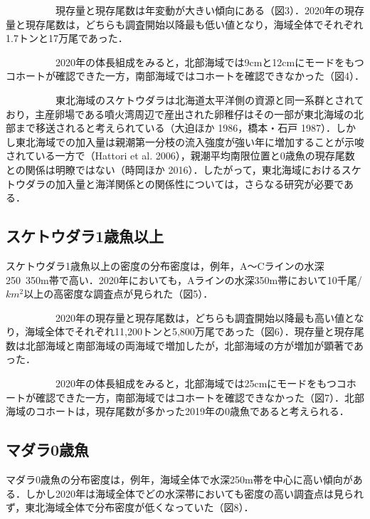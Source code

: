 \documentclass[11pt]{article} %
\begin{document}
\begin{linenumbers}
\ \ \ \ \ \ \ \ \ \ 
現存量と現存尾数は年変動が大きい傾向にある（図3）．2020年の現存量と現存尾数は，どちらも調査開始以降最も低い値となり，海域全体でそれぞれ1.7トンと17万尾であった．

\ \ \ \ \ \ \ \ \ \ 
2020年の体長組成をみると，北部海域では9cmと12cmにモードをもつコホートが確認できた一方，南部海域ではコホートを確認できなかった（図4）．

\ \ \ \ \ \ \ \ \ \ 
東北海域のスケトウダラは北海道太平洋側の資源と同一系群とされており，主産卵場である噴火湾周辺で産出された卵稚仔はその一部が東北海域の北部まで移送されると考えられている（大迫ほか 1986，橋本・石戸 1987）．しかし東北海域での加入量は親潮第一分枝の流入強度が強い年に増加することが示唆されている一方で（Hattori et al. 2006），親潮平均南限位置と0歳魚の現存尾数との関係は明瞭ではない（時岡ほか 2016）．したがって，東北海域におけるスケトウダラの加入量と海洋関係との関係性については，さらなる研究が必要である．

\subsection{スケトウダラ1歳魚以上}
スケトウダラ1歳魚以上の密度の分布密度は，例年，A〜Cラインの水深250~350m帯で高い．2020年においても，Aラインの水深350m帯において10千尾/$km^2$以上の高密度な調査点が見られた（図5）．

\ \ \ \ \ \ \ \ \ \ 
2020年の現存量と現存尾数は，どちらも調査開始以降最も高い値となり，海域全体でそれぞれ11,200トンと5,800万尾であった（図6）．現存量と現存尾数は北部海域と南部海域の両海域で増加したが，北部海域の方が増加が顕著であった．

\ \ \ \ \ \ \ \ \ \ 
2020年の体長組成をみると，北部海域では25cmにモードをもつコホートが確認できた一方，南部海域ではコホートを確認できなかった（図7）．北部海域のコホートは，現存尾数が多かった2019年の0歳魚であると考えられる．


\subsection{マダラ0歳魚}
マダラ0歳魚の分布密度は，例年，海域全体で水深250m帯を中心に高い傾向がある．しかし2020年は海域全体でどの水深帯においても密度の高い調査点は見られず，東北海域全体で分布密度が低くなっていた（図8）．


\end{linenumbers}
\end{document}
